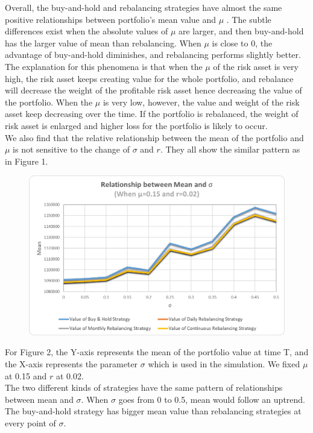\documentclass[
10pt, %
a4paper, %
oneside, %
headinclude,footinclude, %
BCOR5mm, %
]{scrartcl}
\begin{document}
Overall, the buy-and-hold and rebalancing strategies have almost the same positive relationships between portfolio's mean value and $\mu$ . The subtle differences exist when the absolute values of $\mu$ are larger, and then buy-and-hold has the larger value of mean than rebalancing. When $\mu$ is close to 0, the advantage of buy-and-hold diminishes, and rebalancing performs slightly better.\\

The explanation for this phenomena is that when the $\mu$ of the risk asset is very high, the risk asset keeps creating value for the whole portfolio, and rebalance will decrease the weight of the profitable risk asset hence decreasing the value of the portfolio. When the $\mu$ is very low, however, the value and weight of the risk asset keep decreasing over the time. If the portfolio is rebalanced, the weight of risk asset is enlarged and higher loss for the portfolio is likely to occur.\\

We also find that the relative relationship between the mean of the portfolio and $\mu$ is not sensitive to the change of $\sigma$ and $r$. They all show the similar pattern as in Figure 1.\\

\begin{figure}[H]
	\centering
	\includegraphics[width=0.7\linewidth]{mean_sigma_015_002}
	\caption{}
	\label{fig:meansigma015002}
\end{figure}
For Figure 2, the Y-axis represents the mean of the portfolio value at time T, and the X-axis represents the parameter $\sigma$ which is used in the simulation. We fixed $\mu$ at 0.15 and $r$ at 0.02.\\

The two different kinds of strategies have the same pattern of relationships between mean and $\sigma$. When $\sigma$ goes from 0 to 0.5, mean would follow an uptrend. The buy-and-hold strategy has bigger mean value than rebalancing strategies at every point of $\sigma$. \\
\end{document}
